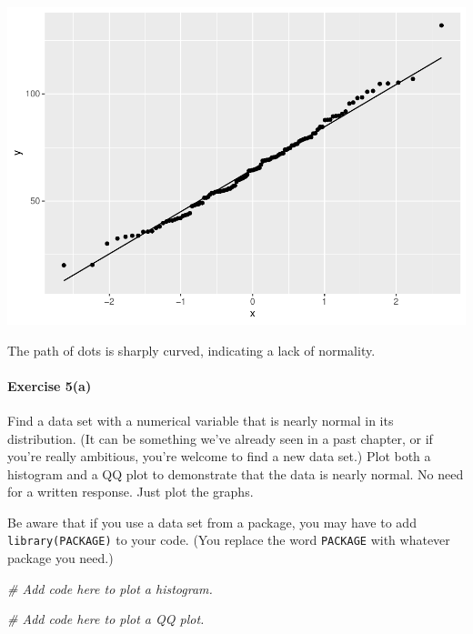\documentclass[
]{book}
\newenvironment{Shaded}{\begin{snugshade}}{\end{snugshade}}
\newcommand{\CommentTok}[1]{\textcolor[rgb]{0.56,0.35,0.01}{\textit{#1}}}
\begin{document}
\includegraphics{intro_stats_files/figure-latex/unnamed-chunk-360-1.pdf}

The path of dots is sharply curved, indicating a lack of normality.

\hypertarget{exercise-5a-1}{%
\paragraph*{Exercise 5(a)}\label{exercise-5a-1}}

Find a data set with a numerical variable that is nearly normal in its distribution. (It can be something we've already seen in a past chapter, or if you're really ambitious, you're welcome to find a new data set.) Plot both a histogram and a QQ plot to demonstrate that the data is nearly normal. No need for a written response. Just plot the graphs.

Be aware that if you use a data set from a package, you may have to add \texttt{library(PACKAGE)} to your code. (You replace the word \texttt{PACKAGE} with whatever package you need.)

\begin{Shaded}
\begin{Highlighting}[]
\CommentTok{\# Add code here to plot a histogram.}
\end{Highlighting}
\end{Shaded}

\begin{Shaded}
\begin{Highlighting}[]
\CommentTok{\# Add code here to plot a QQ plot.}
\end{Highlighting}
\end{Shaded}
\end{document}
